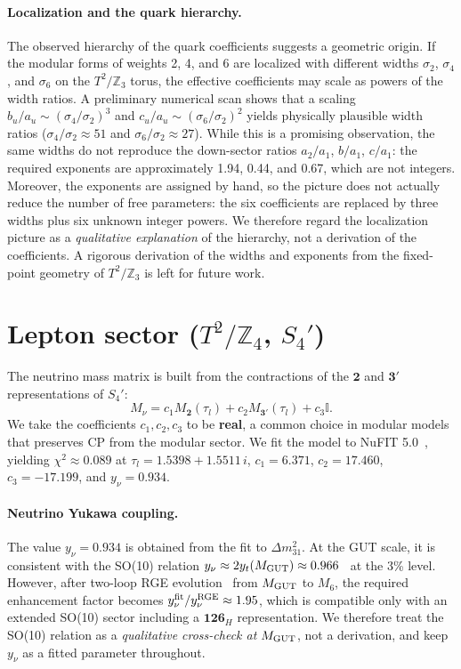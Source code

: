 \documentclass[12pt,a4paper]{article}
\numberwithin{equation}{section}
\begin{document}
\paragraph{Localization and the quark hierarchy.}
The observed hierarchy of the quark coefficients suggests a geometric origin. If the modular forms of weights 2, 4, and 6 are localized with different widths \(\sigma_2\), \(\sigma_4\), and \(\sigma_6\) on the \(T^2/\mathbb{Z}_3\) torus, the effective coefficients may scale as powers of the width ratios. A preliminary numerical scan shows that a scaling \(b_u/a_u \sim (\sigma_4/\sigma_2)^3\) and \(c_u/a_u \sim (\sigma_6/\sigma_2)^2\) yields physically plausible width ratios (\(\sigma_4/\sigma_2 \approx 51\) and \(\sigma_6/\sigma_2 \approx 27\)). While this is a promising observation, the same widths do not reproduce the down-sector ratios \(a_2/a_1\), \(b/a_1\), \(c/a_1\): the required exponents are approximately 1.94, 0.44, and 0.67, which are not integers. Moreover, the exponents are assigned by hand, so the picture does not actually reduce the number of free parameters: the six coefficients are replaced by three widths plus six unknown integer powers. We therefore regard the localization picture as a \emph{qualitative explanation} of the hierarchy, not a derivation of the coefficients. A rigorous derivation of the widths and exponents from the fixed-point geometry of \(T^2/\mathbb{Z}_3\) is left for future work.

\section{Lepton sector (\(T^2/\mathbb{Z}_4\), \(S_4'\))}
\label{sec:lepton}
The neutrino mass matrix is built from the contractions of the \(\mathbf{2}\) and \(\mathbf{3}'\) representations of \(S_4'\):
\begin{equation}
M_\nu = c_1 M_{\mathbf{2}}(\tau_l) + c_2 M_{\mathbf{3}'}(\tau_l) + c_3 \mathbb{I}.
\end{equation}
We take the coefficients \(c_1, c_2, c_3\) to be \textbf{real}, a common choice in modular models that preserves CP from the modular sector. We fit the model to NuFIT 5.0~\cite{NuFIT2020}, yielding \(\chi^2 \approx 0.089\) at \(\tau_l = 1.5398 + 1.5511\,i\), \(c_1 = 6.371\), \(c_2 = 17.460\), \(c_3 = -17.199\), and \(y_\nu = 0.934\).

\paragraph{Neutrino Yukawa coupling.}
The value \(y_\nu = 0.934\) is obtained from the fit to \(\Delta m^2_{31}\). At the GUT scale, it is consistent with the SO(10) relation \(y_\nu \approx 2 y_t(M_{\rm GUT}) \approx 0.966\)~\cite{PendletonRoss1981} at the 3\% level. However, after two-loop RGE evolution~\cite{MartinVaughn1993} from \(M_{\rm GUT}\) to \(M_6\), the required enhancement factor becomes \(y_\nu^{\rm fit}/y_\nu^{\rm RGE} \approx 1.95\), which is compatible only with an extended SO(10) sector including a \(\mathbf{126}_H\) representation. We therefore treat the SO(10) relation as a \emph{qualitative cross-check at \(M_{\rm GUT}\)}, not a derivation, and keep \(y_\nu\) as a fitted parameter throughout.
\end{document}
